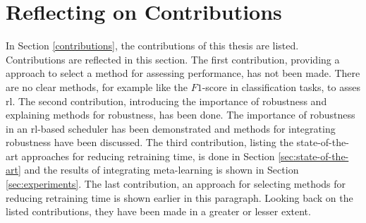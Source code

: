 \section{Reflecting on Contributions}

In Section \ref{contributions}, the contributions of this thesis are listed.
Contributions are reflected in this section. The first contribution,
providing a approach to select a method for assessing performance, has not
been made. There are no clear methods, for example like the $F1$-score in
classification tasks, to asses \gls{rl}. The second contribution, introducing
the importance of robustness and explaining methods for robustness, has been
done. The importance of robustness in an \gls{rl}-based scheduler has been
demonstrated and methods for integrating robustness have been discussed. The
third contribution, listing the state-of-the-art approaches for reducing
retraining time, is done in Section \ref{sec:state-of-the-art} and the results
of integrating meta-learning is shown in Section \ref{sec:experiments}. The
last contribution, an approach for selecting methods for reducing retraining
time is shown earlier in this paragraph. Looking back on the listed
contributions, they have been made in a greater or lesser extent.
